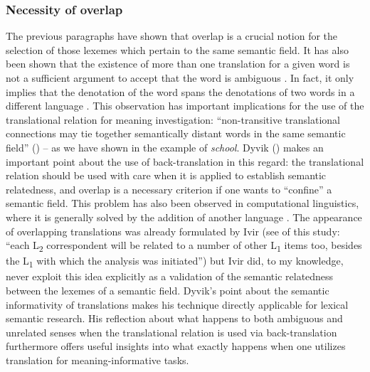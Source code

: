 \subsubsection{Necessity of overlap}
\label{sec:3.4.3.5}
The previous paragraphs have shown that overlap is a crucial notion for the selection of those lexemes which pertain to the same semantic field. It has also been shown that the existence of more than one translation for a given word is not a sufficient argument to accept that the word is ambiguous \citep[30]{langemets_translations_2005}. In fact, it only implies that the denotation of the word spans the denotations of two words in a different language \citep[29]{langemets_translations_2005}. This observation has important implications for the use of the translational relation for meaning investigation: “non-transitive translational connections may tie together semantically distant words in the same semantic field” (\citealt[29]{langemets_translations_2005}) – as we have shown in the example of \textit{school}. Dyvik (\citealt[29]{langemets_translations_2005}) makes an important point about the use of back-translation in this regard: the translational relation should be used with care when it is applied to establish semantic relatedness, and overlap is a necessary criterion if one wants to ``confine'' a semantic field. This problem has also been observed in computational linguistics, where it is generally solved by the addition of another language \citep{gelbukh_five_2013}. The appearance of overlapping translations was already formulated by Ivir (see  of this study: “each L\textsubscript{2} correspondent will be related to a number of other L\textsubscript{1} items too, besides the L\textsubscript{1} with which the analysis was initiated”) but Ivir did, to my knowledge, never exploit this idea explicitly as a validation of the semantic relatedness between the lexemes of a semantic field. Dyvik’s point about the semantic informativity of translations makes his technique directly applicable for lexical semantic research. His reflection about what happens to both ambiguous and unrelated senses when the translational relation is used via back-translation furthermore offers useful insights into what exactly happens when one utilizes translation for meaning-informative tasks.

